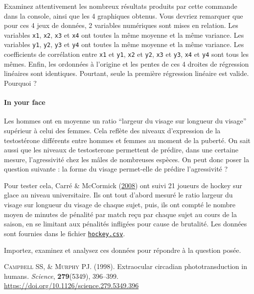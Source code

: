 \documentclass[a4paperpaper,]{article}
\let\oldparagraph\paragraph
\renewcommand{\paragraph}[1]{\oldparagraph{#1}\mbox{}}
\begin{document}
Examinez attentivement les nombreux résultats produits par cette commande dans la console, ainsi que les 4 graphiques obtenus. Vous devriez remarquer que pour ces 4 jeux de données, 2 variables numériques sont mises en relation. Les variables \texttt{x1}, \texttt{x2}, \texttt{x3} et \texttt{x4} ont toutes la même moyenne et la même variance. Les variables \texttt{y1}, \texttt{y2}, \texttt{y3} et \texttt{y4} ont toutes la même moyenne et la même variance. Les coefficients de corrélation entre \texttt{x1} et \texttt{y1}, \texttt{x2} et \texttt{y2}, \texttt{x3} et \texttt{y3}, \texttt{x4} et \texttt{y4} sont tous les mêmes. Enfin, les ordonnées à l'origine et les pentes de ces 4 droites de régression linéaires sont identiques. Pourtant, seule la première régression linéaire est valide. Pourquoi ?

\hypertarget{in-your-face}{%
\paragraph{In your face}\label{in-your-face}}

Les hommes ont en moyenne un ratio ``largeur du visage sur longueur du visage'' supérieur à celui des femmes. Cela reflète des niveaux d'expression de la testostérone différents entre hommes et femmes au moment de la puberté. On sait aussi que les niveaux de testosterone permettent de prédire, dans une certaine mesure, l'agressivité chez les mâles de nombreuses espèces. On peut donc poser la question suivante : la forme du visage permet-elle de prédire l'agressivité ?

Pour tester cela, Carré \& McCormick (\protect\hyperlink{ref-carre2008}{2008}) ont suivi 21 joueurs de hockey sur glace au niveau universitaire. Ils ont tout d'abord mesuré le ratio largeur du visage sur longueur du visage de chaque sujet, puis, ils ont compté le nombre moyen de minutes de pénalité par match reçu par chaque sujet au cours de la saison, en se limitant aux pénalités infligées pour cause de brutalité. Les données sont fournies dans le fichier \href{https://besibo.github.io/Biometrie3/data/hockey.csv}{\texttt{hockey.csv}}.

Importez, examinez et analysez ces données pour répondre à la question posée.

\hypertarget{refs}{}
\leavevmode\hypertarget{ref-Campbell1998}{}%
\textsc{Campbell SS, \& Murphy PJ}. (1998). Extraocular circadian phototransduction in humans. \emph{Science}, \textbf{279}(5349), 396--399. \url{https://doi.org/10.1126/science.279.5349.396}
\end{document}
